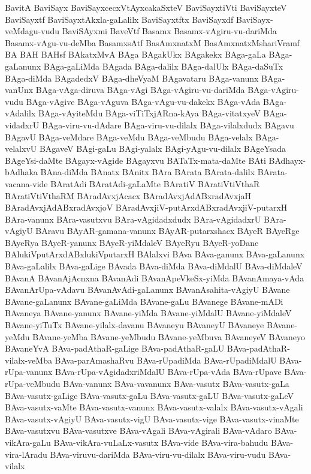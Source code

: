 {BavitA
BaviSayx
BaviSayxcecxVtAyxcakaSxteV
BaviSayxtiVti
BaviSayxteV
BaviSayxtf
BaviSayxtAkxla-gaLalilx
BaviSayxtftx
BaviSayxdf
BaviSayx-veMdagu-vudu
BaviSAyxmi
BaveVtf
Basamx
Basamx-vAgiru-vu-dariMda
Basamx-vAgu-vu-deMba
BasamxsAtf
BasAmxnatxM
BasAmxnatxMshariVramf
BA
BAH
BAHsf
BAkatxMvA
BAga
BAgakUkx
BAgakekx
BAga-gaLa
BAga-gaLanunx
BAga-gaLiMda
BAgada
BAga-dalilx
BAga-dalUlx
BAga-daSuTx
BAga-diMda
BAgadedxV
BAga-dheVyaM
BAgavataru
BAga-vanunx
BAga-vanUnx
BAga-vAga-diruva
BAga-vAgi
BAga-vAgiru-vu-dariMda
BAga-vAgiru-vudu
BAga-vAgive
BAga-vAguva
BAga-vAgu-vu-dakekx
BAga-vAda
BAga-vAdalilx
BAga-vAyiteMdu
BAga-viTiTxjARna-kAya
BAga-vitatxyeV
BAga-vidadxrU
BAga-viru-vu-dAdare
BAga-viru-vu-dilalx
BAga-vilalxdudx
BAgavu
BAgavU
BAga-veMdare
BAga-veMdu
BAga-veMbudu
BAga-velalx
BAga-velalxvU
BAgaveV
BAgi-gaLu
BAgi-yalalx
BAgi-yAgu-vu-dilalx
BAgeYsada
BAgeYsi-daMte
BAgayx-vAgide
BAgayxvu
BATaTx-mata-daMte
BAti
BAdhayx-bAdhaka
BAna-diMda
BAnatx
BAnitx
BAra
BArata
BArata-dalilx
BArata-vacana-vide
BAratAdi
BAratAdi-gaLaMte
BAratiV
BAratiVtiVthaR
BAratiVtiVthaRM
BAradAvxjAcacx
BAradAvxjAdABxradAvxjaH
BAradAvxjAdABxradAvxjoV
BAradAvxjiV-putArxdABxradAvxjiV-putarxH
BAra-vanunx
BAra-vasutxvu
BAra-vAgidadxdudx
BAra-vAgidadxrU
BAra-vAgiyU
BAravu
BAyAR-gamana-vanunx
BAyAR-putarxshacx
BAyeR
BAyeRge
BAyeRya
BAyeR-yanunx
BAyeR-yiMdaleV
BAyeRyu
BAyeR-yoDane
BAlukiVputArxdABxlukiVputarxH
BAlalxvi
BAva
BAva-ganunx
BAva-gaLanunx
BAva-gaLalilx
BAva-gaLige
BAvada
BAva-diMda
BAva-diMdalU
BAva-diMdaleV
BAvanA
BAvanAjAcnxna
BAvanAdi
BAvanApeVkeSx-yiMda
BAvanAmaya-vAda
BAvanArUpa-vAdavu
BAvanAvAdi-gaLanunx
BAvanAsahita-vAgiyU
BAvane
BAvane-gaLanunx
BAvane-gaLiMda
BAvane-gaLu
BAvanege
BAvane-mADi
BAvaneya
BAvane-yanunx
BAvane-yiMda
BAvane-yiMdalU
BAvane-yiMdaleV
BAvane-yiTuTx
BAvane-yilalx-davanu
BAvaneyu
BAvaneyU
BAvaneye
BAvane-yeMdu
BAvane-yeMba
BAvane-yeMbudu
BAvane-yeMbuva
BAvaneyeV
BAvaneyo
BAvaneYvA
BAva-padAthaR-gaLige
BAva-padAthaR-gaLU
BAva-padAthaR-vilalx-veMba
BAva-parAmashaRvu
BAva-rUpadiMda
BAva-rUpadiMdalU
BAva-rUpa-vanunx
BAva-rUpa-vAgidadxriMdalU
BAva-rUpa-vAda
BAva-rUpave
BAva-rUpa-veMbudu
BAva-vanunx
BAva-vavanunx
BAva-vasutx
BAva-vasutx-gaLa
BAva-vasutx-gaLige
BAva-vasutx-gaLu
BAva-vasutx-gaLU
BAva-vasutx-gaLeV
BAva-vasutx-vaMte
BAva-vasutx-vanunx
BAva-vasutx-valalx
BAva-vasutx-vAgali
BAva-vasutx-vAgiyU
BAva-vasutx-vigU
BAva-vasutx-vige
BAva-vasutx-vinaMte
BAva-vasutxvu
BAva-vasutxve
BAva-vAgali
BAva-vAgirali
BAva-vAdaro
BAva-vikAra-gaLu
BAva-vikAra-vuLaLx-vasutx
BAva-vide
BAva-vira-bahudu
BAva-vira-lAradu
BAva-viruvu-dariMda
BAva-viru-vu-dilalx
BAva-viru-vudu
BAva-vilalx
}
